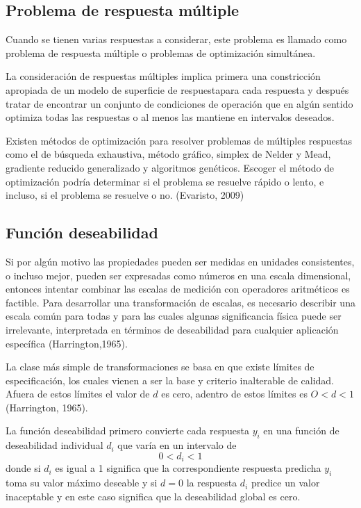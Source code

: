 \subsection{Problema de respuesta m\'ultiple}
Cuando se tienen varias respuestas a considerar, este problema es llamado como
problema de respuesta m\'ultiple o problemas de optimizaci\'on simult\'anea. 

La consideraci\'on de respuestas m\'ultiples implica primera una constricci\'on 
apropiada de un modelo de superficie de respuestapara cada respuesta y despu\'es
tratar de encontrar un conjunto de condiciones de operaci\'on que en alg\'un 
sentido optimiza todas las respuestas o al menos las mantiene en intervalos 
deseados.

Existen m\'etodos de optimizaci\'on para resolver problemas de m\'ultiples 
respuestas como el de b\'usqueda exhaustiva, m\'etodo gr\'afico, simplex de 
Nelder y Mead, gradiente reducido generalizado y algoritmos gen\'eticos. Escoger
el m\'etodo de optimizaci\'on podr\'ia determinar si el problema se resuelve 
r\'apido o lento, e incluso, si el problema se resuelve o no. (Evaristo, 2009)

\subsection{Funci\'on deseabilidad}
Si por alg\'un motivo las propiedades pueden ser medidas en unidades 
consistentes, o incluso mejor, pueden ser expresadas como n\'umeros en una 
escala dimensional, entonces intentar combinar las escalas de medici\'on con
operadores aritm\'eticos es factible. Para desarrollar una transformaci\'on de
escalas, es necesario describir una escala com\'un para todas y para las cuales
algunas significancia f\'isica puede ser irrelevante, interpretada en t\'erminos
de deseabilidad para cualquier aplicaci\'on espec\'ifica (Harrington,1965).

La clase m\'as simple  de transformaciones se basa en que existe l\'imites de
especificaci\'on, los cuales vienen a ser la base y criterio inalterable de 
calidad. Afuera de estos l\'imites el valor de $d$ es cero, adentro de estos 
l\'imites es $O<d<1$ (Harrington, 1965).

La funci\'on deseabilidad primero convierte cada respuesta $y_i$ en una 
funci\'on de deseabilidad individual $d_i$ que var\'ia en un intervalo de 
$$0<d_i<1$$
donde si $d_i$ es igual a 1 significa que la correspondiente respuesta predicha
$y_i$ toma su valor m\'aximo deseable y si $d=0$ la respuesta $d_i$ predice un 
valor inaceptable  y en este caso significa que la deseabilidad global es cero.


